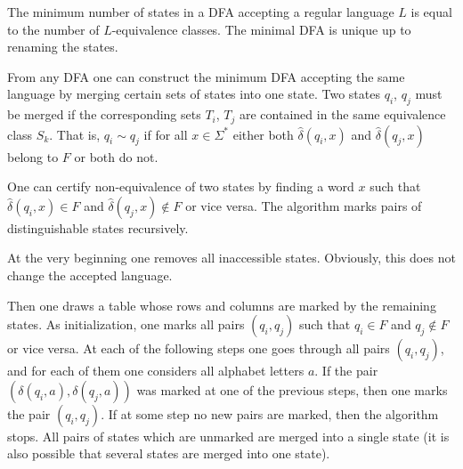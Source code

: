 \begin{page}
\setcounter{section}{4}
\setcounter{subsection}{3}
\setcounter{dfn}{8}
\label{portion:1067}

\begin{cor}
The minimum number of states in a DFA accepting a regular language $L$ is equal to the number of $L$-equivalence classes.
The minimal DFA is unique up to renaming the states.
\end{cor}

\end{page}

\begin{page}
\setcounter{section}{4}
\setcounter{subsection}{3}
\setcounter{dfn}{8}
\label{portion:1068}



From any DFA one can construct the minimum DFA accepting the same language by merging certain sets of states into one state.
Two states $q_i$, $q_j$ must be merged if the corresponding sets $T_i$, $T_j$ are contained in the same equivalence class $S_k$.
That is, $q_i \sim q_j$ if for all $x \in \Sigma^*$ either both $\widehat{\delta}(q_i, x)$ and $\widehat{\delta}(q_j, x)$ belong to $F$ or both do not.

One can certify non-equivalence of two states by finding a word $x$ such that $\widehat{\delta}(q_i, x) \in F$ and $\widehat{\delta}(q_j, x) \notin F$
or vice versa.
The algorithm marks pairs of distinguishable states recursively.

At the very beginning one removes all inaccessible states.
Obviously, this does not change the accepted language.

Then one draws a table whose rows and columns are marked by the remaining states.
As initialization, one marks all pairs $(q_i,q_j)$ such that $q_i \in F$ and $q_j \notin F$ or vice versa.
At each of the following steps one goes through all pairs $(q_i,q_j)$, and for each of them one considers all alphabet letters $a$.
If the pair $(\delta(q_i,a), \delta(q_j,a))$ was marked at one of the previous steps, then one marks the pair $(q_i, q_j)$.
If at some step no new pairs are marked, then the algorithm stops.
All pairs of states which are unmarked are merged into a single state
(it is also possible that several states are merged into one state).


\end{page}

